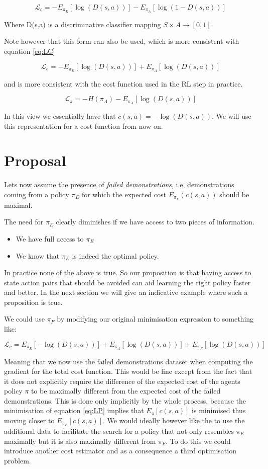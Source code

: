 \documentclass[letterpaper, 10 pt, conference]{ieeeconf}
\begin{document}
\[
\mathcal{L}_c = -E_{\pi_E}[\log(D(s,a))] - E_{\pi_A}[\log(1- D(s,a))]
\]

Where D(s,a) is a discriminative classifier mapping $S\times A \rightarrow [0,1]$.

Note however that this form can also be used, which is more consistent with equation \ref{eq:LC}

\[
\mathcal{L}_c = -E_{\pi_E}[\log(D(s,a))] + E_{\pi_A}[\log(D(s,a))]
\]

and is more consistent with the cost function used in the RL step in practice.

\[
\mathcal{L}_{\pi} = -H(\pi_A) - E_{\pi_A}[\log(D(s,a))] \label{eq:LP}
\] 

In this view we essentially have that $c(s,a) = -\log(D(s,a))$. We will use this representation for a cost function from now on.


\section{Proposal}

Lets now assume the presence of \emph{failed demonstrations}, i.e, demonstrations coming from a policy $\pi_E$ for which the expected cost $E_{\pi_F}(c(s,a))$ should be maximal.

The need for $\pi_E$ clearly diminishes if we have access to two pieces of information.

\begin{itemize}
    \item We have full access to $\pi_E$
    \item We know that $\pi_E$ is indeed the optimal policy.
\end{itemize}

In practice none of the above is true. So our proposition is that having access to state action pairs that should be avoided can aid learning the right policy faster and better. In the next section we will give an indicative example where such a proposition is true.

 We could use $\pi_F$ by modifying our original minimisation expression to something like:

\[
\mathcal{L}_c = E_{\pi_E}[-\log(D(s,a))] + E_{\pi_A}[\log(D(s,a))] + E_{\pi_F}[\log(D(s,a))] \label{eq:LCf}
\]

Meaning that we now use the failed demonstrations dataset when computing the gradient for the total cost function. This would be fine except from the fact that it does not explicitly require the difference of the expected cost of the agents policy $\pi$ to be maximally different from the expected cost of the failed demonstrations. This is done only implicitly by the whole process, because the minimisation of equation \ref{eq:LP} implies that $E_{\pi}[c(s,a)]$ is minimised thus moving closer to $E_{\pi_E}[c(s,a)]$. We would ideally however like the to use the additional data to facilitate the search for a policy that not only resembles $\pi_E$ maximally but it is also maximally different from $\pi_F$. To do this we could introduce another cost estimator and as a consequence a third optimisation problem.
\end{document}
